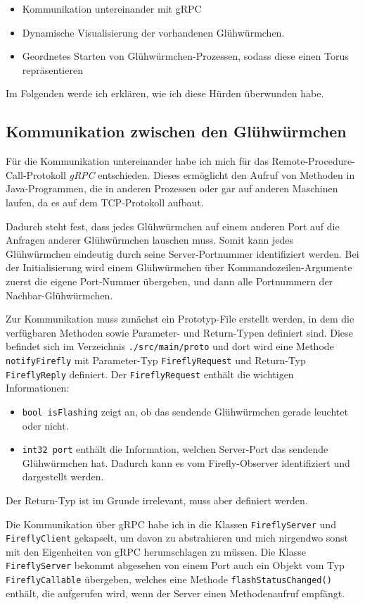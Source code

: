 \documentclass[12pt]{article}
\begin{document}
\begin{itemize}
	\item Kommunikation untereinander mit gRPC
	\item Dynamische Visualisierung der vorhandenen Glühwürmchen.
	\item Geordnetes Starten von Glühwürmchen-Prozessen, sodass diese einen Torus repräsentieren
\end{itemize}

Im Folgenden werde ich erklären, wie ich diese Hürden überwunden habe.

\subsection*{Kommunikation zwischen den Glühwürmchen}
Für die Kommunikation untereinander habe ich mich für das Remote-Procedure-Call-Protokoll \emph{gRPC} entschieden. Dieses ermöglicht den Aufruf von Methoden in Java-Programmen, die in anderen Prozessen oder gar auf anderen Maschinen laufen, da es auf dem TCP-Protokoll aufbaut.

Dadurch steht fest, dass jedes Glühwürmchen auf einem anderen Port auf die Anfragen anderer Glühwürmchen lauschen muss. Somit kann jedes Glühwürmchen eindeutig durch seine Server-Portnummer identifiziert werden. Bei der Initialisierung wird einem Glühwürmchen über Kommandozeilen-Argumente zuerst die eigene Port-Nummer übergeben, und dann alle Portnummern der Nachbar-Glühwürmchen.

Zur Kommunikation muss zunächst ein Prototyp-File erstellt werden, in dem die verfügbaren Methoden sowie Parameter- und Return-Typen definiert sind. Diese befindet sich im Verzeichnis \texttt{./src/main/proto} und dort wird eine Methode \texttt{notifyFirefly} mit Parameter-Typ \texttt{FireflyRequest} und Return-Typ \texttt{FireflyReply} definiert.
Der \texttt{FireflyRequest} enthält die wichtigen Informationen: 
\begin{itemize}
	\item \texttt{bool isFlashing} zeigt an, ob das sendende Glühwürmchen gerade leuchtet oder nicht.
	\item \texttt{int32 port} enthält die Information, welchen Server-Port das sendende Glühwürmchen hat. Dadurch kann es vom Firefly-Observer identifiziert und dargestellt werden.
\end{itemize}

Der Return-Typ ist im Grunde irrelevant, muss aber definiert werden.

Die Kommunikation über gRPC habe ich in die Klassen \texttt{FireflyServer} und \texttt{FireflyClient} gekapselt, um davon zu abstrahieren und mich nirgendwo sonst mit den Eigenheiten von gRPC herumschlagen zu müssen. Die Klasse \texttt{FireflyServer} bekommt abgesehen von einem Port auch ein Objekt vom Typ \texttt{FireflyCallable} übergeben, welches eine Methode \texttt{flashStatusChanged()} enthält, die aufgerufen wird, wenn der Server einen Methodenaufruf empfängt.
\end{document}
